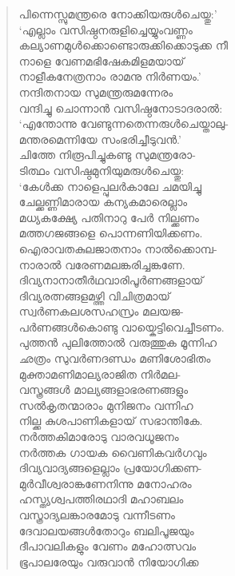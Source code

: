\begin{verse}
പിന്നെസ്സുമന്ത്രരെ നോക്കിയരുള്‍ചെയ്തു:’\\
‘എല്ലാം വസിഷ്ഠനരുളിച്ചെയ്യുംവണ്ണം\\
കല്യാണമുള്‍ക്കൊണ്ടൊരുക്കിക്കൊടുക്ക നീ\\
നാളെ വേണമഭിഷേകമിളമയായ്\\
നാളീകനേത്രനാം രാമനു നിര്‍ണയം.’\\
നന്ദിതനായ സുമന്ത്രരുമന്നേരം\\
വന്ദിച്ചു ചൊന്നാന്‍ വസിഷ്ഠനോടാദരാല്‍:\\
‘എന്തോന്നു വേണ്ടുന്നതെന്നരുള്‍ചെയ്താലു-\\
മന്തരമെന്നിയേ സംഭരിച്ചീടുവന്‍.’\\
ചിത്തേ നിരൂപിച്ചുകണ്ടു സുമന്ത്രരോ-\\
ടിത്ഥം വസിഷ്ഠമുനിയുമരുള്‍ചെയ്തു:\\
‘കേള്‍ക്ക നാളെപ്പുലര്‍കാലേ ചമയിച്ചു\\
ചേല്ക്കണ്ണിമാരായ കന്യകമാരെല്ലാം\\
മധ്യകക്ഷ്യേ പതിനാറു പേര്‍ നില്ക്കണം\\
മത്തഗജങ്ങളെ പൊന്നണിയിക്കണം.\\
ഐരാവതകുലജാതനാം നാല്‍ക്കൊമ്പ-\\
നാരാല്‍ വരേണമലങ്കരിച്ചങ്കണേ.\\
ദിവ്യനാനാതീര്‍ഥവാരിപൂര്‍ണങ്ങളായ്\\
ദിവ്യരത്നങ്ങളമഴ്ത്തി വിചിത്രമായ്\\
സ്വര്‍ണകലശസഹസ്രം മലയജ-\\
പര്‍ണങ്ങള്‍കൊണ്ടു വായ്കെട്ടിവെച്ചീടണം.\\
പുത്തന്‍ പുലിത്തോല്‍ വരുത്തുക മൂന്നിഹ\\
ഛത്രം സുവര്‍ണദണ്ഡം മണിശോഭിതം\\
മുക്താമണിമാല്യരാജിത നിര്‍മല-\\
വസ്ത്രങ്ങള്‍ മാല്യങ്ങളാഭരണങ്ങളും\\
സല്‍കൃതന്മാരാം മുനിജനം വന്നിഹ\\
നില്ക്ക കുശപാണികളായ് സഭാന്തികേ.\\
നര്‍ത്തകിമാരോടു വാരവധൂജനം\\
നര്‍ത്തക ഗായക വൈണികവര്‍ഗവും\\
ദിവ്യവാദ്യങ്ങളെല്ലാം പ്രയോഗിക്കണ-\\
മുര്‍വീശ്വരാങ്കണേനിന്നു മനോഹരം\\
ഹസ്ത്യശ്വപത്തിരഥാദി മഹാബലം\\
വസ്ത്രാദ്യലങ്കാരമോടു വന്നീടണം\\
ദേവാലയങ്ങള്‍തോറും ബലിപൂജയും\\
ദീപാവലികളും വേണം മഹോത്സവം\\
ഭൂപാലരേയും വരുവാന്‍ നിയോഗിക്ക\\

\end{verse}
